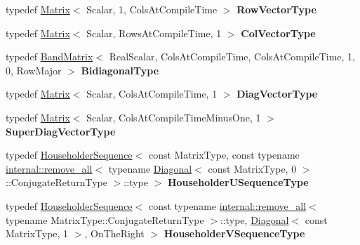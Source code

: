 \begin{DoxyCompactItemize}
typedef \mbox{\hyperlink{class_eigen_1_1_matrix}{Matrix}}$<$ Scalar, 1, Cols\+At\+Compile\+Time $>$ {\bfseries Row\+Vector\+Type}
\item 
\mbox{\label{class_eigen_1_1internal_1_1_upper_bidiagonalization_aa23c833f35d51d1175d3532fb27396bf}} 
typedef \mbox{\hyperlink{class_eigen_1_1_matrix}{Matrix}}$<$ Scalar, Rows\+At\+Compile\+Time, 1 $>$ {\bfseries Col\+Vector\+Type}
\item 
\mbox{\label{class_eigen_1_1internal_1_1_upper_bidiagonalization_a3ea5d3b9879d66c9a561a8979ad999f3}} 
typedef \mbox{\hyperlink{class_eigen_1_1internal_1_1_band_matrix}{Band\+Matrix}}$<$ Real\+Scalar, Cols\+At\+Compile\+Time, Cols\+At\+Compile\+Time, 1, 0, Row\+Major $>$ {\bfseries Bidiagonal\+Type}
\item 
\mbox{\label{class_eigen_1_1internal_1_1_upper_bidiagonalization_adcf1dbaabda1d16ef09931c5bc2a71db}} 
typedef \mbox{\hyperlink{class_eigen_1_1_matrix}{Matrix}}$<$ Scalar, Cols\+At\+Compile\+Time, 1 $>$ {\bfseries Diag\+Vector\+Type}
\item 
\mbox{\label{class_eigen_1_1internal_1_1_upper_bidiagonalization_ad7491c3ca1a7985168c2c2b1dafe4ddf}} 
typedef \mbox{\hyperlink{class_eigen_1_1_matrix}{Matrix}}$<$ Scalar, Cols\+At\+Compile\+Time\+Minus\+One, 1 $>$ {\bfseries Super\+Diag\+Vector\+Type}
\item 
\mbox{\label{class_eigen_1_1internal_1_1_upper_bidiagonalization_a159f80e8c094ea6b53082ac9446923a8}} 
typedef \mbox{\hyperlink{class_eigen_1_1_householder_sequence}{Householder\+Sequence}}$<$ const Matrix\+Type, const typename \mbox{\hyperlink{struct_eigen_1_1internal_1_1remove__all}{internal\+::remove\+\_\+all}}$<$ typename \mbox{\hyperlink{class_eigen_1_1_diagonal}{Diagonal}}$<$ const Matrix\+Type, 0 $>$\+::Conjugate\+Return\+Type $>$\+::type $>$ {\bfseries Householder\+U\+Sequence\+Type}
\item 
\mbox{\label{class_eigen_1_1internal_1_1_upper_bidiagonalization_aa93645d9dfab0b02287e8b66b4018007}} 
typedef \mbox{\hyperlink{class_eigen_1_1_householder_sequence}{Householder\+Sequence}}$<$ const typename \mbox{\hyperlink{struct_eigen_1_1internal_1_1remove__all}{internal\+::remove\+\_\+all}}$<$ typename Matrix\+Type\+::\+Conjugate\+Return\+Type $>$\+::type, \mbox{\hyperlink{class_eigen_1_1_diagonal}{Diagonal}}$<$ const Matrix\+Type, 1 $>$, On\+The\+Right $>$ {\bfseries Householder\+V\+Sequence\+Type}
\end{DoxyCompactItemize}

